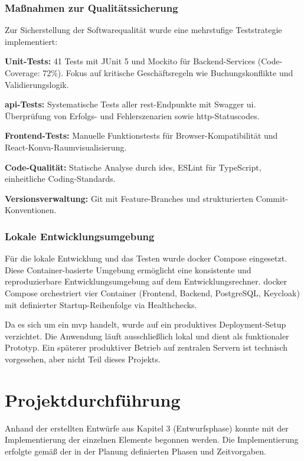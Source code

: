 \documentclass[11pt,a4paper]{report}
\begin{document}
\subsection{Maßnahmen zur Qualitätssicherung}

Zur Sicherstellung der Softwarequalität wurde eine mehrstufige Teststrategie implementiert:

\textbf{Unit-Tests:} 41 Tests mit JUnit 5 und Mockito für Backend-Services (Code-Coverage: 72\%). Fokus auf kritische Geschäftsregeln wie Buchungskonflikte und Validierungslogik.

\textbf{\gls{api}-Tests:} Systematische Tests aller \gls{rest}-Endpunkte mit Swagger \gls{ui}. Überprüfung von Erfolgs- und Fehlerszenarien sowie \gls{http}-Statuscodes.

\textbf{Frontend-Tests:} Manuelle Funktionstests für Browser-Kompatibilität und React-Konva-Raumvisualisierung.

\textbf{Code-Qualität:} Statische Analyse durch \glspl{ide}, ESLint für TypeScript, einheitliche Coding-Standards.

\textbf{Versionsverwaltung:} Git mit Feature-Branches und strukturierten Commit-Konventionen.

\subsection{Lokale Entwicklungsumgebung}

Für die lokale Entwicklung und das Testen wurde \gls{docker} Compose eingesetzt. Diese Container-basierte Umgebung ermöglicht eine konsistente und reproduzierbare Entwicklungsumgebung auf dem Entwicklungsrechner. \gls{docker} Compose orchestriert vier Container (Frontend, Backend, PostgreSQL, Keycloak) mit definierter Startup-Reihenfolge via Healthchecks.

Da es sich um ein \gls{mvp} handelt, wurde auf ein produktives Deployment-Setup verzichtet. Die Anwendung läuft ausschließlich lokal und dient als funktionaler Prototyp. Ein späterer produktiver Betrieb auf zentralen Servern ist technisch vorgesehen, aber nicht Teil dieses Projekts.

\chapter{Projektdurchführung}

Anhand der erstellten Entwürfe aus Kapitel 3 (Entwurfsphase) konnte mit der Implementierung der einzelnen Elemente begonnen werden. Die Implementierung erfolgte gemäß der in der Planung definierten Phasen und Zeitvorgaben.
\end{document}
